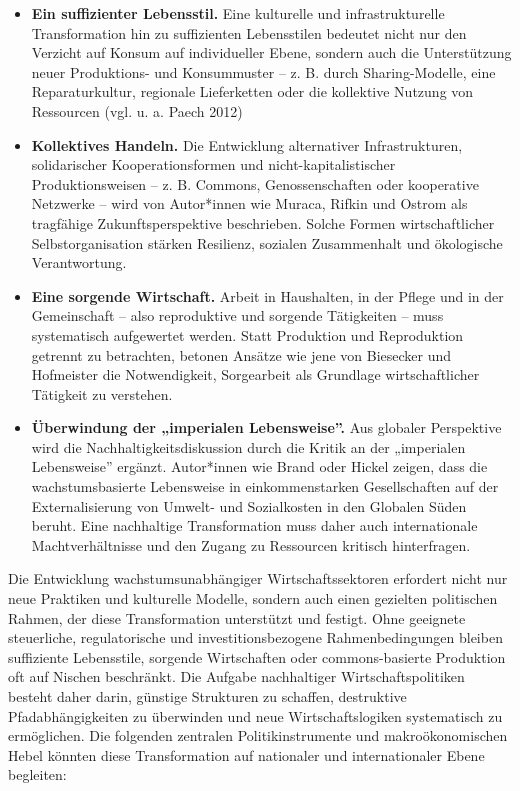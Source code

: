 \documentclass[
  nswissgerman,
  a4paper,
  DIV=11,
  numbers=noendperiod,
  oneside,
  openany]{scrreprt}
\begin{document}
\begin{itemize}
\item
  \textbf{Ein suffizienter Lebensstil.} Eine kulturelle und
  infrastrukturelle Transformation hin zu suffizienten Lebensstilen
  bedeutet nicht nur den Verzicht auf Konsum auf individueller Ebene,
  sondern auch die Unterstützung neuer Produktions- und Konsummuster --
  z. B. durch Sharing-Modelle, eine Reparaturkultur, regionale
  Lieferketten oder die kollektive Nutzung von Ressourcen (vgl. u. a.
  Paech 2012)
\item
  \textbf{Kollektives Handeln.} Die Entwicklung alternativer
  Infrastrukturen, solidarischer Kooperationsformen und
  nicht-kapitalistischer Produktionsweisen -- z. B. Commons,
  Genossenschaften oder kooperative Netzwerke -- wird von Autor*innen
  wie Muraca, Rifkin und Ostrom als tragfähige Zukunftsperspektive
  beschrieben. Solche Formen wirtschaftlicher Selbstorganisation stärken
  Resilienz, sozialen Zusammenhalt und ökologische Verantwortung.
\item
  \textbf{Eine sorgende Wirtschaft.} Arbeit in Haushalten, in der Pflege
  und in der Gemeinschaft -- also reproduktive und sorgende Tätigkeiten
  -- muss systematisch aufgewertet werden. Statt Produktion und
  Reproduktion getrennt zu betrachten, betonen Ansätze wie jene von
  Biesecker und Hofmeister die Notwendigkeit, Sorgearbeit als Grundlage
  wirtschaftlicher Tätigkeit zu verstehen.
\item
  \textbf{Überwindung der „imperialen Lebensweise''.} Aus globaler
  Perspektive wird die Nachhaltigkeitsdiskussion durch die Kritik an der
  „imperialen Lebensweise'' ergänzt. Autor*innen wie Brand oder Hickel
  zeigen, dass die wachstumsbasierte Lebensweise in einkommenstarken
  Gesellschaften auf der Externalisierung von Umwelt- und Sozialkosten
  in den Globalen Süden beruht. Eine nachhaltige Transformation muss
  daher auch internationale Machtverhältnisse und den Zugang zu
  Ressourcen kritisch hinterfragen.
\end{itemize}

Die Entwicklung wachstumsunabhängiger Wirtschaftssektoren erfordert
nicht nur neue Praktiken und kulturelle Modelle, sondern auch einen
gezielten politischen Rahmen, der diese Transformation unterstützt und
festigt. Ohne geeignete steuerliche, regulatorische und
investitionsbezogene Rahmenbedingungen bleiben suffiziente Lebensstile,
sorgende Wirtschaften oder commons-basierte Produktion oft auf Nischen
beschränkt. Die Aufgabe nachhaltiger Wirtschaftspolitiken besteht daher
darin, günstige Strukturen zu schaffen, destruktive Pfadabhängigkeiten
zu überwinden und neue Wirtschaftslogiken systematisch zu ermöglichen.
Die folgenden zentralen Politikinstrumente und makroökonomischen Hebel
könnten diese Transformation auf nationaler und internationaler Ebene
begleiten:
\end{document}
